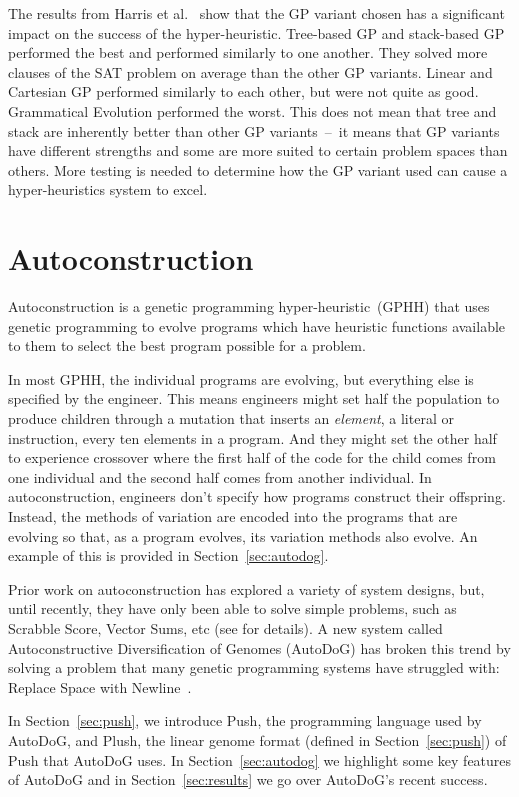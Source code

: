 \documentclass{sig-alternate}
\begin{document}
The results from Harris et al.~\cite{harris:2015} show that the GP variant chosen has a significant impact on the success of the hyper-heuristic. Tree-based GP and stack-based GP performed the best and performed similarly to one another. They solved more clauses of the SAT problem on average than the other GP variants. Linear and Cartesian GP performed similarly to each other, but were not quite as good. Grammatical Evolution performed the worst. This does not mean that tree and stack are inherently better than other GP variants~--~it means that GP variants have different strengths and some are more suited to certain problem spaces than others. More testing is needed to determine how the GP variant used can cause a hyper-heuristics system to excel.

\section{Autoconstruction}
\label{sec:ac}
Autoconstruction is a genetic programming hyper-heur\-istic~(GPHH) that uses genetic programming to evolve programs which have heuristic functions available to them to select the best program possible for a problem. 

In most GPHH, the individual programs are evolving, but everything else is specified by the engineer. This means engineers might set half the population to produce children through a mutation that inserts an \textit{element}, a literal or instruction, every ten elements in a program. And they might set the other half to experience crossover where the first half of the code for the child comes from one individual and the second half comes from another individual. In autoconstruction, engineers don't specify how programs construct their offspring. Instead, the methods of variation are encoded into the programs that are evolving so that, as a program evolves, its variation methods also evolve. An example of this is provided in Section~\ref{sec:autodog}.

Prior work on autoconstruction has explored a variety of system designs, but, until recently, they have only been able to solve simple problems, such as Scrabble Score, Vector Sums, etc (see \cite{helmuth:2015} for details). A new system called Autoconstructive Diversification of Genomes (AutoDoG) has broken this trend by solving a problem that many genetic programming systems have struggled with: Replace Space with Newline~\cite{spector:2016}.

In Section~\ref{sec:push}, we introduce Push, the programming language used by AutoDoG, and Plush, the linear genome format (defined in Section~\ref{sec:push}) of Push that AutoDoG uses. In Section~\ref{sec:autodog} we highlight some key features of AutoDoG and in Section~\ref{sec:results} we go over AutoDoG's recent success.
\end{document}
